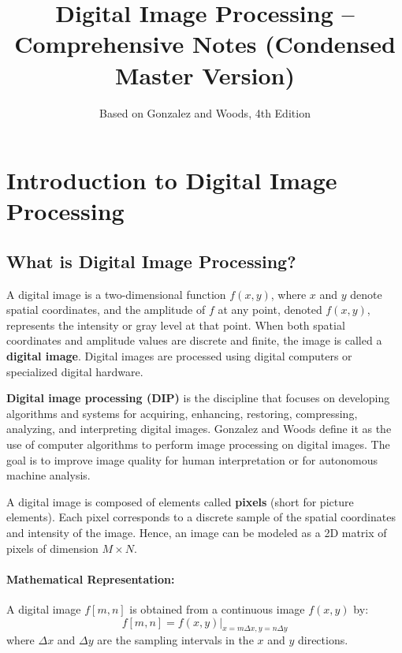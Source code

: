 \documentclass[12pt,a4paper]{AnantDocumentation}
\title{\textbf{Digital Image Processing -- Comprehensive Notes (Condensed Master Version)}}
\author{Based on Gonzalez and Woods, 4th Edition}
\date{}
\begin{document}
\maketitle

\tableofcontents
\newpage

\section{Introduction to Digital Image Processing}

\subsection{What is Digital Image Processing?}
A digital image is a two-dimensional function $f(x, y)$, where $x$ and $y$ denote spatial coordinates, and the amplitude of $f$ at any point, denoted $f(x, y)$, represents the intensity or gray level at that point. When both spatial coordinates and amplitude values are discrete and finite, the image is called a \textbf{digital image}. Digital images are processed using digital computers or specialized digital hardware.

\textbf{Digital image processing (DIP)} is the discipline that focuses on developing algorithms and systems for acquiring, enhancing, restoring, compressing, analyzing, and interpreting digital images. Gonzalez and Woods define it as the use of computer algorithms to perform image processing on digital images. The goal is to improve image quality for human interpretation or for autonomous machine analysis.

A digital image is composed of elements called \textbf{pixels} (short for picture elements). Each pixel corresponds to a discrete sample of the spatial coordinates and intensity of the image. Hence, an image can be modeled as a 2D matrix of pixels of dimension $M \times N$.

\paragraph{Mathematical Representation:} A digital image $f[m, n]$ is obtained from a continuous image $f(x, y)$ by:
\begin{equation}
f[m, n] = f(x, y) \big|_{x = m \Delta x, y = n \Delta y}
\end{equation}
where $\Delta x$ and $\Delta y$ are the sampling intervals in the $x$ and $y$ directions.
\end{document}
